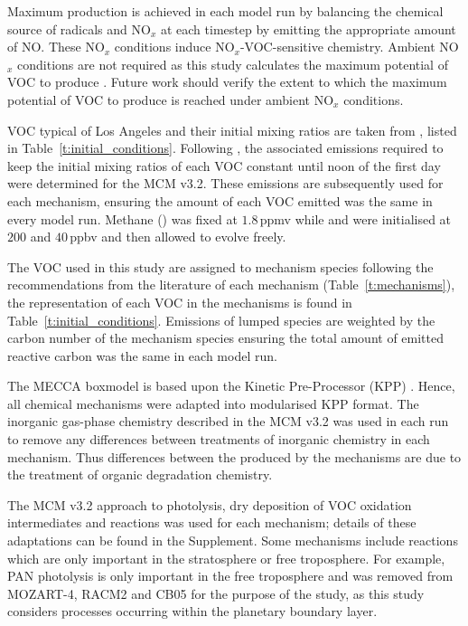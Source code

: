 \documentclass[acpd, online, hvmath]{copernicus}
\begin{document}
Maximum  production is achieved in each model run by
balancing the chemical source of radicals and NO$_{x}$ at each
timestep by emitting the appropriate amount of NO.  These NO$_{x}$
conditions induce NO$_{x}$-VOC-sensitive chemistry.  Ambient
NO$_{x}$ conditions are not required as this study calculates the
maximum potential of VOC to produce .  Future work should
verify the extent to which the maximum potential of VOC to produce
 is reached under ambient NO$_{x}$ conditions.

VOC typical of Los Angeles and their initial mixing ratios are taken
from \citet{Baker:2008}, listed in Table~\ref{t:initial_conditions}.
Following \citet{Butler:2011}, the associated emissions required to
keep the initial mixing ratios of each VOC constant until noon of the
first day were determined for the MCM v3.2.  These emissions are
subsequently used for each mechanism, ensuring the amount of each VOC
emitted was the same in every model run.  Methane () was
fixed at $1.8$\,\unit{ppmv} while  and  were
initialised at $200$ and $40$\,\unit{ppbv} and then
allowed to evolve freely.

The VOC used in this study are assigned to mechanism species
following the recommendations from the literature of each mechanism
(Table~\ref{t:mechanisms}), the representation of each VOC in the
mechanisms is found in Table~\ref{t:initial_conditions}.  Emissions of
lumped species are weighted by the carbon number of the mechanism
species ensuring the total amount of emitted reactive carbon was the
same in each model run.

The MECCA boxmodel is based upon the Kinetic Pre-Processor (KPP)
\citep{Damian:2002}.  Hence, all chemical mechanisms were adapted into
modularised KPP format.  The inorganic gas-phase chemistry described
in the MCM v3.2 was used in each run to remove any differences between
treatments of inorganic chemistry in each mechanism.  Thus differences
between the  produced by the mechanisms are due to the
treatment of organic degradation chemistry.

The MCM v3.2 approach to photolysis, dry deposition of VOC oxidation
intermediates and  reactions was used for each
mechanism; details of these adaptations can be found in the Supplement.  Some mechanisms include reactions which are
only important in the stratosphere or free troposphere.  For example,
PAN photolysis is only important in the free troposphere
\citep{Harwood:2003} and was removed from MOZART-4, RACM2 and CB05 for
the purpose of the study, as this study considers processes occurring
within the planetary boundary layer.
\end{document}
